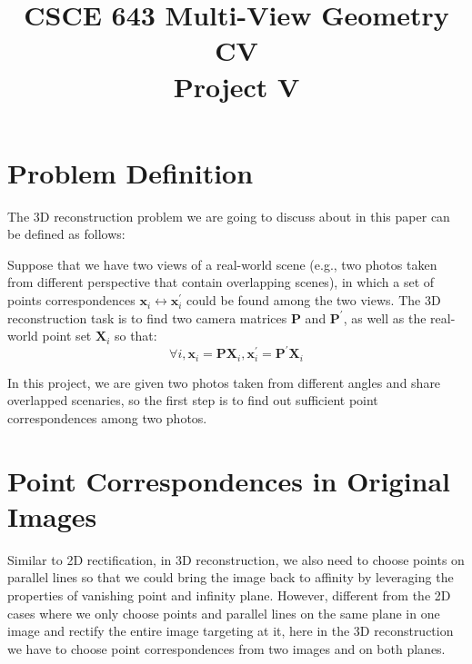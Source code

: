 \documentclass[conference]{IEEEtran}
\newcommand{\mat}[1]{\mathbf{#1}} %
\begin{document}
\title{CSCE 643 Multi-View Geometry CV\\
Project V}





\maketitle

\IEEEpeerreviewmaketitle

\section{Problem Definition}
The 3D reconstruction problem we are going to discuss about in this paper can be defined as follows:

Suppose that we have two views of a real-world scene (e.g., two photos taken from different perspective that contain overlapping scenes), in which a set of points correspondences $\mat{x}_i\leftrightarrow \mat{x}_i^\prime$ could be found among the two views. The 3D reconstruction task is to find two camera matrices $\mat{P}$ and $\mat{P}^\prime$, as well as the real-world point set $\mat{X}_i$ so that:
\begin{equation}
	\forall i, \mat{x}_i = \mat{P}\mat{X}_i, \mat{x}_i^\prime = \mat{P}^\prime \mat{X}_i
\end{equation}

In this project, we are given two photos taken from different angles and share overlapped scenaries, so the first step is to find out sufficient point correspondences among two photos.

\section{Point Correspondences in Original Images}
Similar to 2D rectification, in 3D reconstruction, we also need to choose points on parallel lines so that we could bring the image back to affinity by leveraging the properties of vanishing point and infinity plane. However, different from the 2D cases where we only choose points and parallel lines on the same plane in one image and rectify the entire image targeting at it, here in the 3D reconstruction we have to choose point correspondences from two images and on both planes.
\end{document}
